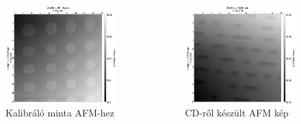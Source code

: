 \documentclass[aspectratio=169]{beamer}
\begin{document}
\begin{frame}
\begin{columns}
\begin{figure}
\includegraphics[width=.95\textwidth]{afm_kalib.png}
\caption{Kalibráló minta AFM-hez}
\end{figure}
\begin{figure}
\includegraphics[width=.95\textwidth]{afm_cd.png}
\caption{CD-ről készült AFM kép}
\end{figure}
\end{columns}
\end{frame}
\end{document}
